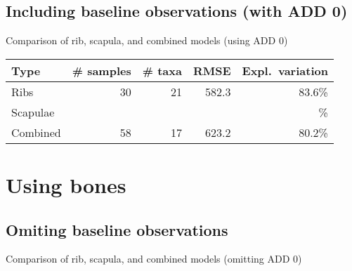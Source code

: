\documentclass{beamer}
\begin{document}



\subsection{Including baseline observations (with ADD 0)}

\begin{frame}{Comparison of rib, scapula, and combined models (using ADD 0)}

  \begin{tabular}{lrrrr}
    Type & \# samples & \# taxa & RMSE & Expl.\ variation\\ \hline
    Ribs & 30 & 21 & 582.3 & 83.6\% \\
    Scapulae &  &  &  & \% \\
    Combined & 58 & 17 & 623.2 & 80.2\%
  \end{tabular}

\end{frame}








\section{Using bones}


\subsection{Omiting baseline observations}

\begin{frame}{Comparison of rib, scapula, and combined models (omitting ADD 0)}


  \vspace{0.2in}



\end{frame}
\end{document}
